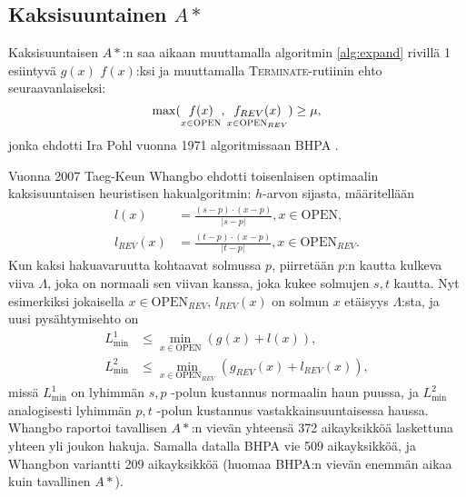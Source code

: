 \documentclass[finnish]{tktltiki2}
\theoremstyle{definition}
\theoremstyle{remark}
\begin{document}
\subsection{Kaksisuuntainen $A\ast$}
Kaksisuuntaisen $A\ast$:n saa aikaan muuttamalla algoritmin \ref{alg:expand} rivillä 1 esiintyvä $g(x)$ $f(x)$:ksi ja muuttamalla \textsc{Terminate}-rutiinin ehto seuraavanlaiseksi:
\[
\max( \underset{x \in \textsc{OPEN}}{f(x)}, \underset{x \in \textsc{OPEN}_{REV}}{f_{REV}(x)} ) \geq \mu,
\]
jonka ehdotti Ira Pohl vuonna 1971 algoritmissaan BHPA \cite{Pohl71}.

Vuonna 2007 Taeg-Keun Whangbo ehdotti toisenlaisen optimaalin kaksisuuntaisen heuristisen hakualgoritmin: $h$-arvon sijasta, määritellään
\begin{align*}
l(x) &= \frac{(s - p) \cdot (x - p)}{ | s - p | }, x \in \text{OPEN}, \\
l_{REV}(x) &= \frac{(t - p) \cdot (x - p)}{ | t - p | }, x \in \text{OPEN}_{REV}.
\end{align*}
Kun kaksi hakuavaruutta kohtaavat solmussa $p$, piirretään $p$:n kautta kulkeva viiva $\Lambda$, joka on normaali sen viivan kanssa, joka kukee solmujen $s, t$ kautta. Nyt esimerkiksi jokaisella $x \in \text{OPEN}_{REV}$, $l_{REV}(x)$ on solmun $x$ etäisyys $\Lambda$:sta, ja uusi pysähtymisehto on
\begin{align*}
L^1_{\min} & \leq \underset{x \in \text{OPEN}}{\min} (g(x) + l(x)), \\
L^2_{\min} & \leq \underset{x \in \text{OPEN}_{REV}}{\min} (g_{REV}(x) + l_{REV}(x)),
\end{align*}
missä $L_{\min}^1$ on lyhimmän $s, p$ -polun kustannus normaalin haun puussa, ja $L_{\min}^2$ analogisesti lyhimmän $p, t$ -polun kustannus vastakkainsuuntaisessa haussa. Whangbo raportoi tavallisen $A\ast$:n vievän yhteensä 372 aikayksikköä laskettuna yhteen yli joukon hakuja. Samalla datalla BHPA vie 509 aikayksikköä, ja Whangbon variantti 209 aikayksikköä (huomaa BHPA:n vievän enemmän aikaa kuin tavallinen $A\ast$).
\end{document}
